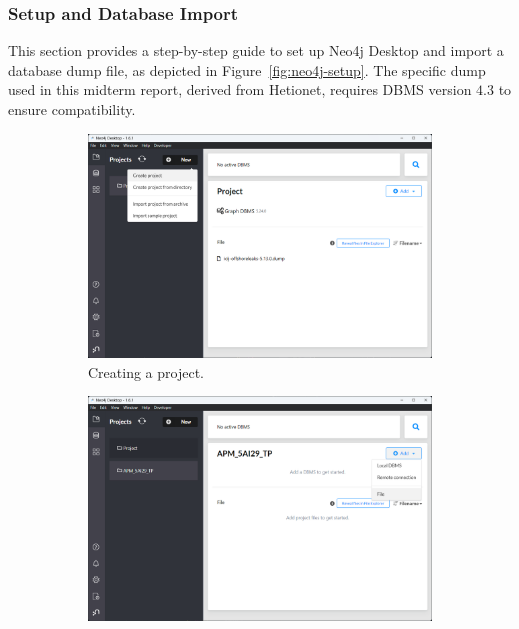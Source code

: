 \subsubsection*{Setup and Database Import}

This section provides a step-by-step guide to set up Neo4j Desktop and import a database dump file, as depicted in Figure~\ref{fig:neo4j-setup}. The specific dump used in this midterm report, derived from Hetionet, requires DBMS version $4.3$ to ensure compatibility.

\begin{figure}
    \centering
    \begin{subfigure}[b]{0.49\textwidth}
        \centering
        \includegraphics[width=\textwidth]{images/neo4j-setup/1}
        \caption{Creating a project.}
    \end{subfigure}
    \hfill
    \begin{subfigure}[b]{0.49\textwidth}
        \centering
        \includegraphics[width=\textwidth]{images/neo4j-setup/2}

\end{subfigure}
\end{figure}
